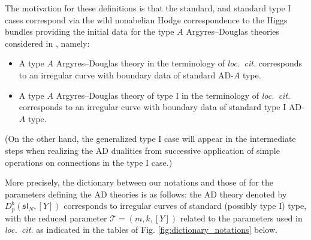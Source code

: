 \documentclass[11pt,a4paper]{amsart}
\numberwithin{equation}{section}
\begin{document}
The motivation for these definitions is that the standard, and standard type I cases correspond via the wild nonabelian Hodge correspondence to the Higgs bundles providing the initial data for the type $A$ Argyres--Douglas theories considered in \cite{beem2025simplifying}, namely:
\begin{itemize}
\item A type $A$ Argyres--Douglas theory in the terminology of \emph{loc.~cit.} corresponds to an irregular curve with boundary data of standard AD-$A$ type.
\item A type $A$ Argyres--Douglas theory  of type I in the terminology of \emph{loc.~cit.} corresponds to an irregular curve with boundary data of standard type I AD-$A$ type.
\end{itemize}
(On the other hand, the generalized type I case will appear in the intermediate steps when realizing the AD dualities from successive application of simple operations on connections  in the type I case.)

More precisely, the dictionary between our notations and those of \cite{beem2025simplifying} for the parameters defining the AD theories is as follows: the AD theory denoted by $D_p^b(\mathfrak{sl}_N, [Y])$ corresponds to irregular curves of standard (possibly type I) type, with the reduced parameter $\mathscr T=(m, k, [Y])$ related to the parameters used in \emph{loc.~cit.} as indicated in the tables of Fig. \ref{fig:dictionary_notations} below.
\end{document}
